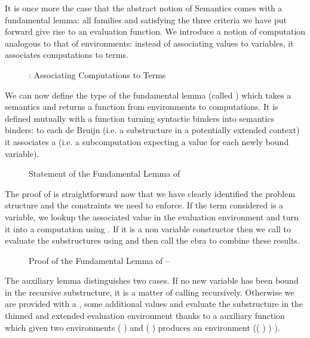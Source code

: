 

It is once more the case that the abstract notion of Semantics comes with a
fundamental lemma: all   families  and  satisfying
the three criteria we have put forward give rise to an evaluation function.
We introduce a notion of computation  analogous to that of environments:
instead of associating values to variables, it associates computations to terms.

\begin{figure}[h]
\caption{: Associating Computations to Terms}
\end{figure}

We can now define the type of the fundamental lemma (called ) which
takes a semantics and returns a function from environments to computations. It is
defined mutually with a function  turning syntactic binders into
semantics binders: to each de Bruijn  (i.e. a substructure in a potentially
extended context) it associates a  (i.e. a subcomputation expecting a
value for each newly bound variable).

\begin{figure}[h]
\caption{Statement of the Fundamental Lemma of }
\end{figure}

The proof of  is straightforward now that we have clearly identified the
problem structure and the constraints we need to enforce. If the term considered
is a variable, we lookup the associated value in the evaluation environment and
turn it into a computation using . If it is a non variable constructor
then we call  to evaluate the substructures using  and then
call the ebra to combine these results.

\begin{figure}[h]
\caption{Proof of the Fundamental Lemma of  -- }
\end{figure}

The auxiliary lemma  distinguishes two cases. If no new variable has
been bound in the recursive substructure, it is a matter of calling 
recursively. Otherwise we are provided with a , some additional
values and evaluate the substructure in the thinned and extended evaluation
environment thanks to a auxiliary function \AF{\_>>\_} which given two
environments {( )  } and {( )  }
produces an environment {(( \AF{++} ) )  )}.

